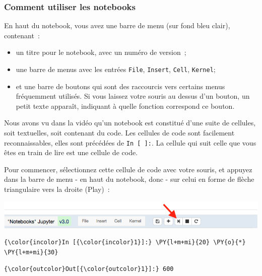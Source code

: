     \hypertarget{comment-utiliser-les-notebooks}{%
\subsubsection{Comment utiliser les
notebooks}\label{comment-utiliser-les-notebooks}}

    En haut du notebook, vous avez une barre de menu (sur fond bleu clair),
contenant~:

\begin{itemize}
	\item 
     un titre pour le notebook, avec un numéro de version~;
     \item
     une barre de menus avec les entrées \texttt{File}, \texttt{Insert},
     \texttt{Cell}, \texttt{Kernel};
     \item
     et une barre de boutons qui sont des
    raccourcis vers certains menus fréquemment utilisés. Si vous laissez
	votre souris au dessus d'un bouton, un petit texte apparaît, indiquant à
	quelle fonction correspond ce bouton.
\end{itemize}

Nous avons vu dans la vidéo qu'un notebook est constitué d'une suite de
cellules, soit textuelles, soit contenant du code. Les cellules de code
sont facilement reconnaissables, elles sont précédées de
\texttt{In\ {[}\ {]}:}. La cellule qui suit celle que vous êtes en train
de lire est une cellule de code.

Pour commencer, sélectionnez cette cellule de code avec votre souris, et
appuyez dans la barre de menu - en haut du notebook, donc - sur celui en
forme de flèche triangulaire vers la droite (Play)~: 

\includegraphics{medias/notebook-eval-button.png}\\

    \begin{Verbatim}[commandchars=\\\{\}]
{\color{incolor}In [{\color{incolor}1}]:} \PY{l+m+mi}{20} \PY{o}{*} \PY{l+m+mi}{30}
\end{Verbatim}


\begin{Verbatim}[commandchars=\\\{\}]
{\color{outcolor}Out[{\color{outcolor}1}]:} 600
\end{Verbatim}
            
